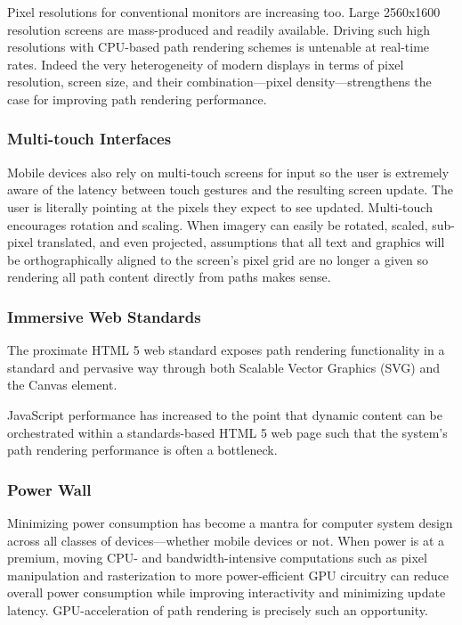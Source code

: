 Pixel resolutions for conventional monitors are increasing too.
Large 2560x1600 resolution screens are mass-produced and readily
available.  Driving such high resolutions with CPU-based path rendering
schemes is untenable at real-time rates.  Indeed the very heterogeneity of modern displays in terms of
pixel resolution, screen size, and their combination---pixel
density---strengthens the case for improving path rendering performance.

\subsubsection{Multi-touch Interfaces}

Mobile devices also rely on multi-touch screens for input so the user is
extremely aware of the latency between touch gestures and the resulting
screen update.  The user is literally pointing at the pixels they expect
to see updated.  Multi-touch encourages rotation and scaling.
When imagery can easily be rotated, scaled, sub-pixel translated, and even
projected, assumptions that all text and graphics will be orthographically aligned to
the screen's pixel grid are no longer a given so
rendering all path content directly from paths makes sense.

\subsubsection{Immersive Web Standards}

The proximate HTML 5 web standard exposes path rendering functionality
in a standard and pervasive way through both Scalable Vector Graphics (SVG)
and the Canvas element.

JavaScript performance has increased to the point that dynamic content
can be orchestrated within a standards-based HTML 5 web page such that
the system's path rendering performance is often a bottleneck.

\subsubsection{Power Wall}

Minimizing power consumption has become a mantra for computer system
design across all classes of devices---whether mobile devices or not.
When power is at a premium, moving CPU- and bandwidth-intensive
computations such as pixel manipulation and rasterization to
more power-efficient GPU circuitry can reduce overall power
consumption while improving interactivity and minimizing update latency.
GPU-acceleration of path rendering is precisely such an opportunity.

